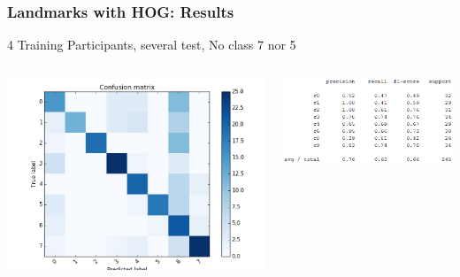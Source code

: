 \documentclass{beamer}
\begin{document}
	\begin{frame}
		\frametitle{Landmarks with HOG: Results}
		4 Training Participants, several test, No class 7 nor 5
		\begin{columns}
			\begin{column}{0.5\textwidth}
				\begin{center}
					\includegraphics[width=\textwidth]{mult_HOG/4c01234689matTest2}\\			
				\end{center}
			\end{column}
			\begin{column}{0.5\textwidth}
				\begin{center}
					\includegraphics[width=\textwidth]{mult_HOG/4c01234689repTest2}
				\end{center}
			\end{column}
		\end{columns}		
	\end{frame}	
	
\end{document}
